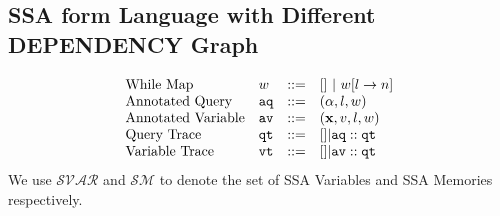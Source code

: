 \subsection{SSA form Language with Different DEPENDENCY Graph}
\[
\begin{array}{llll}
%
\mbox{While Map} 
& w & ::= & [] ~|~  w[l \to n]
\\
%
\mbox{Annotated Query} 
& \aq & ::= & (\qval, l , w )
\\
%
\mbox{Annotated Variable} 
& \av & ::= & (\ssa{x}, v, l , w )
\\
%
\mbox{Query Trace} & \qtrace
& ::= & [] | \aq :: \qtrace
\\
%
\mbox{Variable Trace} & \vtrace
& ::= & [] | \av :: \qtrace
\end{array}
\]
%
We use $\mathcal{SVAR}$ and $\mathcal{SM}$ to denote the set of SSA Variables and SSA Memories respectively.
%
